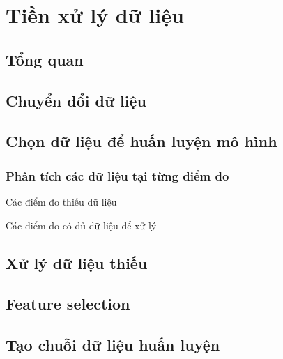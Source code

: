 
\section{Tiền xử lý dữ liệu}
\subsection{Tổng quan}
\subsection{Chuyển đổi dữ liệu}
\subsection{Chọn dữ liệu để huấn luyện mô hình}
\subsubsection{Phân tích các dữ liệu tại từng điểm đo}
Các điểm đo thiếu dữ liệu

Các điểm đo có đủ dữ liệu để xử lý



\subsection{Xử lý dữ liệu thiếu}
\subsection{Feature selection}
\subsection{Tạo chuỗi dữ liệu huấn luyện}
